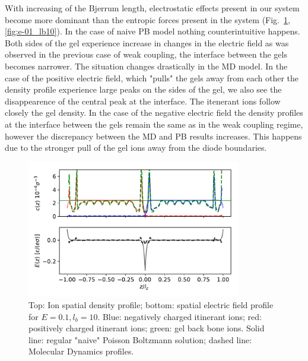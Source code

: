 \documentclass[twoside,twocolumn,9pt]{article}
\begin{document}
With increasing of the Bjerrum length, electrostatic effects present in our system become more dominant than the entropic forces present in the system (Fig.~\ref{fig:e01_lb10}, \ref{fig:e-01_lb10}). In the case of naive PB model nothing counterintuitive happens. Both sides of the gel experience increase in changes in the electric field as was observed in the previous case of weak coupling, the interface between the gels becomes narrower. The situation changes drastically in the MD model. In the case of the positive electric field, which "pulls" the gels away from each other the density profile experience large peaks on the sides of the gel, we also see the disappearence of the central peak at the interface. The itenerant ions follow closely the gel density. In the case of the negative electric field the density profiles at the interface between the gels remain the same as in the weak coupling regime, however the discrepancy between the MD and PB results increases. This happens due to the stronger pull of the gel ions away from the diode boundaries.



\begin{figure}[h]
\centering
  \includegraphics[height=6cm]{fig/Compare_E01_lb10.pdf}
  \caption{Top: Ion spatial density profile; bottom: spatial electric field profile for $E=0.1, l_b=10$. Blue: negatively charged itinerant ions; red: positively charged itinerant ions; green: gel back bone ions. Solid line: regular "naive" Poisson Boltzmann solution; dashed line: Molecular Dynamics profiles.}
  \label{fig:e01_lb10}
\end{figure}
\end{document}
